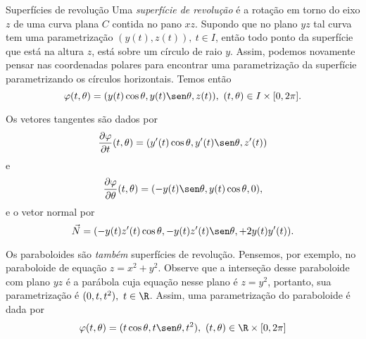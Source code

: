 \begin{example}{Superfícies de revolução}{}
    Uma \textit{superfície de revolução} é a rotação em torno do eixo $z$ de uma curva plana $C$ contida no pano $xz$. Supondo que no plano $yz$ tal curva tem uma parametrização $(y(t),z(t)),~t\in I$, então todo ponto da superfície que está na altura $z$, está sobre um círculo de raio $y$. Assim, podemos novamente pensar nas coordenadas polares para encontrar uma parametrização da superfície parametrizando os círculos horizontais. Temos então
    $$\varphi(t,\theta)=(y(t)\cos \theta,y(t)\sen\theta,z(t)),~(t,\theta)\in I\times [0,2\pi]. $$

Os vetores tangentes são dados por 
$$
\dfrac{\partial \varphi}{\partial t}(t,\theta)=(y'(t)\cos\theta,y'(t)\sen\theta,z'(t))
$$
e
$$\dfrac{\partial \varphi}{\partial \theta}(t,\theta) = (-y(t)\sen\theta,y(t)\cos\theta,0),$$
e o vetor normal por
$$\vec{N}=(-y(t)z'(t)\cos \theta,-y(t)z'(t)\sen \theta,+2y(t)y'(t)).$$




Os paraboloides são \textit{também} superfícies de revolução. Pensemos, por exemplo, no paraboloide de equação $z=x^2+y^2$. Observe que a interseção desse paraboloide com plano $yz$ é a parábola cuja equação nesse plano é $z=y^2$, portanto, sua parametrização é $(0,t,t^2),~t\in\R$. Assim, uma parametrização do paraboloide é dada por 
$$\varphi(t,\theta)=(t\cos\theta,t\sen\theta,t^2),~(t,\theta)\in\R\times[0,2\pi]$$

\begin{center}
    \begin{comment}\begin{tikzpicture}[tdplot_main_coords,scale=2.0]
		\pgfmathsetmacro{\tini}{0.5*pi}
		\pgfmathsetmacro{\tfin}{1.85*pi}
		\pgfmathsetmacro{\tend}{2.5*pi}
		\draw[-latex] (0,0,0) -- (1.5,0,0) node [below left] {$x$};
		\draw[dashed] (0,0,0) -- (-0.75,0,0);
		\draw[-latex] (0,0,0) -- (0,1.5,0) node [right] {$y$};
		\draw[dashed] (0,0,0) -- (0,-1.25,0);

\draw[red] plot[domain=-0.35*pi:-3*pi/2,smooth,variable=\t] ({cos(\t r)},{sin(\t r)},{1.0}); 

\draw[yellow,very thick]  plot[domain=-sqrt(1.5):0.1,smooth,variable=\t] ({0},{\t},{\t*\t}); 
  

\end{comment}
\end{center}
\end{example}
